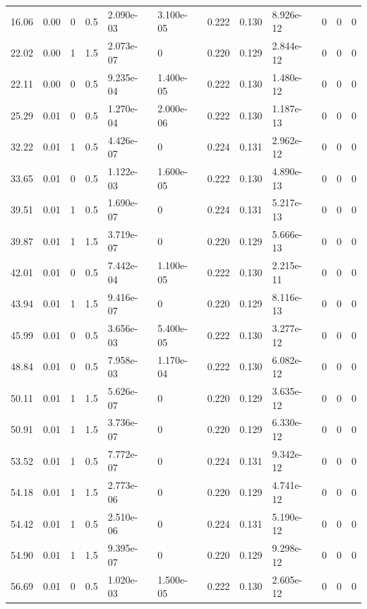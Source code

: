 \documentclass[preview]{standalone}
\begin{document}
{{\begin{tabular}{L{1.2cm}C{1.2cm} C{0.3cm}C{0.5cm} C{1.4cm}C{1.4cm} C{1.4cm}C{1.4cm} C{1.6cm}C{1.6cm} C{1.6cm}C{1.6cm}}
  16.06  &  0.00  & 0     & 0.5 &  2.090e-03  & 3.100e-05  &  0.222&   0.130& 8.926e-12 & 0   &  0 & 0  \\ 
  22.02  &  0.00  & 1     & 1.5 &  2.073e-07  & 0  &  0.220&   0.129& 2.844e-12 & 0   &  0 & 0  \\ 
  22.11  &  0.00  & 0     & 0.5 &  9.235e-04  & 1.400e-05  &  0.222&   0.130& 1.480e-12 & 0   &  0 & 0  \\ 
  25.29  &  0.01  & 0     & 0.5 &  1.270e-04  & 2.000e-06  &  0.222&   0.130& 1.187e-13 & 0   &  0 & 0  \\ 
  32.22  &  0.01  & 1     & 0.5 &  4.426e-07  & 0  &  0.224&   0.131& 2.962e-12 & 0   &  0 & 0  \\ 
  33.65  &  0.01  & 0     & 0.5 &  1.122e-03  & 1.600e-05  &  0.222&   0.130& 4.890e-13 & 0   &  0 & 0  \\ 
  39.51  &  0.01  & 1     & 0.5 &  1.690e-07  & 0  &  0.224&   0.131& 5.217e-13 & 0   &  0 & 0  \\ 
  39.87  &  0.01  & 1     & 1.5 &  3.719e-07  & 0  &  0.220&   0.129& 5.666e-13 & 0   &  0 & 0  \\ 
  42.01  &  0.01  & 0     & 0.5 &  7.442e-04  & 1.100e-05  &  0.222&   0.130& 2.215e-11 & 0   &  0 & 0  \\ 
  43.94  &  0.01  & 1     & 1.5 &  9.416e-07  & 0  &  0.220&   0.129& 8.116e-13 & 0   &  0 & 0  \\ 
  45.99  &  0.01  & 0     & 0.5 &  3.656e-03  & 5.400e-05  &  0.222&   0.130& 3.277e-12 & 0   &  0 & 0  \\ 
  48.84  &  0.01  & 0     & 0.5 &  7.958e-03  & 1.170e-04  &  0.222&   0.130& 6.082e-12 & 0   &  0 & 0  \\ 
  50.11  &  0.01  & 1     & 1.5 &  5.626e-07  & 0  &  0.220&   0.129& 3.635e-12 & 0   &  0 & 0  \\ 
  50.91  &  0.01  & 1     & 1.5 &  3.736e-07  & 0  &  0.220&   0.129& 6.330e-12 & 0   &  0 & 0  \\ 
  53.52  &  0.01  & 1     & 0.5 &  7.772e-07  & 0  &  0.224&   0.131& 9.342e-12 & 0   &  0 & 0  \\ 
  54.18  &  0.01  & 1     & 1.5 &  2.773e-06  & 0  &  0.220&   0.129& 4.741e-12 & 0   &  0 & 0  \\ 
  54.42  &  0.01  & 1     & 0.5 &  2.510e-06  & 0  &  0.224&   0.131& 5.190e-12 & 0   &  0 & 0  \\ 
  54.90  &  0.01  & 1     & 1.5 &  9.395e-07  & 0  &  0.220&   0.129& 9.298e-12 & 0   &  0 & 0  \\ 
  56.69  &  0.01  & 0     & 0.5 &  1.020e-03  & 1.500e-05  &  0.222&   0.130& 2.605e-12 & 0   &  0 & 0  \\ 

\end{tabular}}}
\end{document}
